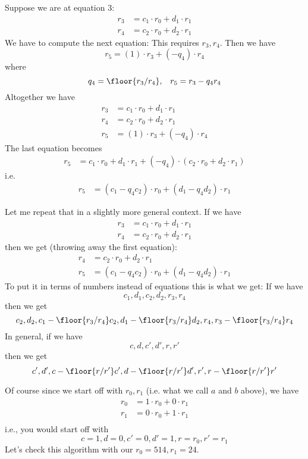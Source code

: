 Suppose we are at equation 3:
\begin{align*}
r_3 &= c_1 \cdot r_0 + d_1 \cdot r_1  \\
r_4 &= c_2 \cdot r_0 + d_2 \cdot r_1 
\end{align*}
We have to compute the next equation:
This requires $r_3, r_4$.
Then we have
\[
r_5 = (1) \cdot r_3 + (-q_4) \cdot r_4
\]
where
\[
q_4 = \floor{r_3/r_4}, \,\,\,\,\, r_5 = r_3 - q_4r_4
\]
Altogether we have
\begin{align*}
r_3 &= c_1 \cdot r_0 + d_1 \cdot r_1     \\
r_4 &= c_2 \cdot r_0 + d_2 \cdot r_1     \\
r_5 &= (1) \cdot r_3 + (-q_4) \cdot r_4 
\end{align*}
The last equation becomes
\begin{align*}
r_5 &= c_1 \cdot r_0 + d_1 \cdot r_1  
+ 
(-q_4) \cdot (c_2 \cdot r_0 + d_2 \cdot r_1)
\end{align*}
i.e.
\begin{align*}
r_5 &= (c_1 - q_4 c_2) \cdot r_0 + (d_1 - q_4 d_2) \cdot r_1 
\end{align*}

Let me repeat that in a slightly more general context.
If we have
\begin{align*}
r_3 &= c_1 \cdot r_0 + d_1 \cdot r_1  \\
r_4 &= c_2 \cdot r_0 + d_2 \cdot r_1 
\end{align*}
then we get (throwing away the first equation):
\begin{align*}
r_4 &=c_2 \cdot r_0 + d_2 \cdot r_1 \\
r_5 &= (c_1 - q_4 c_2) \cdot r_0 + (d_1 - q_4 d_2) \cdot r_1 
\end{align*}
To put it in terms of numbers instead of equations this is what we get:
If we have
\[
c_1, d_1, c_2, d_2, r_3, r_4
\]
then we get
\[
c_2, d_2, 
c_1 - \floor{r_3/r_4} c_2, 
d_1 - \floor{r_3/r_4}d_2, 
r_4, r_3 - \floor{r_3/r_4}r_4
\]
In general, if we have
\[
c, d, c', d', r, r'
\]
then we get
\[
c', d', 
c - \floor{r/r'} c', d - \floor{r/r'}d', 
r', r - \floor{r/r'}r'
\]

Of course since we start off with $r_0, r_1$ (i.e. what we call $a$ and $b$
above), we have
\begin{align*}
r_0 &= 1 \cdot r_0 + 0 \cdot r_1 \\
r_1 &= 0 \cdot r_0 + 1 \cdot r_1 \\
\end{align*}
i.e., you would start off with
\[
c=1, d=0, c'=0, d'=1, r=r_0, r'=r_1
\]
Let's check this algorithm with our $r_0 = 514, r_1 = 24$.

